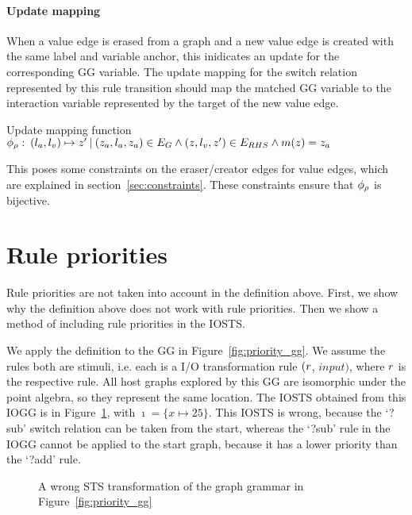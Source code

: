 \paragraph*{Update mapping}\label{sec:updates}
When a value edge is erased from a graph and a new value edge is created with the same label and variable anchor, this inidicates an update for the corresponding GG variable. The update mapping for the switch relation represented by this rule transition should map the matched GG variable to the interaction variable represented by the target of the new value edge.
\vspace{10px}\begin{definition}\label{def:um} Update mapping function
\vspace{2px} \\
$\phi_{\rho}:\: (l_a, l_v) \mapsto z'\: |\: (z_a, l_a, z_a) \in E_{G} \land (z, l_v, z') \in E_{RHS} \land m(z) = z_a$
\end{definition}
\vspace{10px}
This poses some constraints on the eraser/creator edges for value edges, which are explained in section~\ref{sec:constraints}. These constraints ensure that $\phi_{\rho}$ is bijective.

\section{Rule priorities}
Rule priorities are not taken into account in the definition above. First, we show why the definition above does not work with rule priorities. Then we show a method of including rule priorities in the IOSTS.

We apply the definition to the GG in Figure~\ref{fig:priority_gg}. We assume the rules both are stimuli, i.e. each is a I/O transformation rule $(r$, $\mathit{input})$, where $r$ is the respective rule. All host graphs explored by this GG are isomorphic under the point algebra, so they represent the same location. The IOSTS obtained from this IOGG is in Figure~\ref{fig:priority_sts_wrong}, with $\imath = \{x \mapsto 25\}$. This IOSTS is wrong, because the `?sub' switch relation can be taken from the start, whereas the `?sub' rule in the IOGG cannot be applied to the start graph, because it has a lower priority than the `?add' rule.

\begin{figure}[ht]
  \begin{center}
    
  \end{center}
  \caption{A wrong STS transformation of the graph grammar in Figure~\ref{fig:priority_gg}}
  \label{fig:priority_sts_wrong}
\end{figure}

